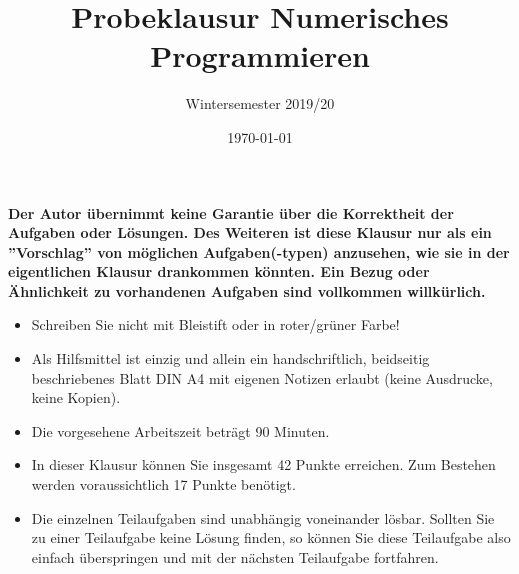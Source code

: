 \documentclass{scrartcl}
\begin{document}
\title{Probeklausur Numerisches Programmieren}
\subtitle{Wintersemester 2019/20}
\author{\npauthor{}}
\date{\today}
\maketitle

\noindent\textbf{Der Autor übernimmt keine Garantie über die Korrektheit der Aufgaben oder Lösungen. \n Des Weiteren ist diese Klausur nur als ein ''Vorschlag'' von möglichen Aufgaben(-typen) anzusehen, wie sie in der eigentlichen Klausur drankommen könnten. Ein Bezug oder Ähnlichkeit zu vorhandenen Aufgaben sind vollkommen willkürlich.}
\sbreak

\begin{itemize}
	\item Schreiben Sie nicht mit Bleistift oder in roter/grüner Farbe!
	\item Als Hilfsmittel ist einzig und allein ein handschriftlich, beidseitig beschriebenes Blatt DIN A4 mit eigenen Notizen erlaubt (keine Ausdrucke, keine Kopien).
	\item Die vorgesehene Arbeitszeit beträgt 90 Minuten.
	\item In dieser Klausur können Sie insgesamt 42 Punkte erreichen. Zum Bestehen werden voraussichtlich 17 Punkte benötigt.
	\item Die einzelnen Teilaufgaben sind unabhängig voneinander lösbar.
	Sollten Sie zu einer Teilaufgabe keine Lösung finden, so können Sie diese Teilaufgabe also einfach überspringen und mit der nächsten Teilaufgabe fortfahren.
\end{itemize}

\end{document}
